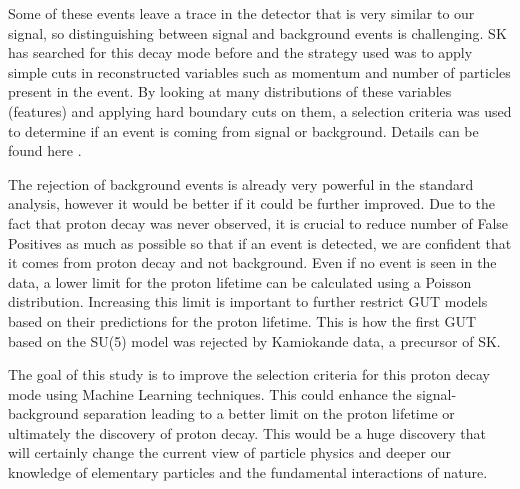 Some of these events leave a trace in the detector that is very similar to our signal, so distinguishing between signal and background events is challenging. SK has searched for this decay mode before and the strategy used was to apply simple cuts in reconstructed variables such as momentum and number of particles present in the event. By looking at many distributions of these variables (features) and applying hard boundary cuts on them, a selection criteria was used to determine if an event is coming from signal or background. Details can be found here \cite{Miura}.

The rejection of background events is already very powerful in the standard analysis, however it would be better if it could be further improved. Due to the fact that proton decay was never observed, it is crucial to reduce number of False Positives as much as possible so that if an event is detected, we are confident that it comes from proton decay and not background. Even if no event is seen in the data, a lower limit for the proton lifetime can be calculated using a Poisson distribution. Increasing this limit is important to further restrict GUT models based on their predictions for the proton lifetime. This is how the first GUT based on the SU(5) model was rejected by Kamiokande data, a precursor of SK.

The goal of this study is to improve the selection criteria for this proton decay mode using Machine Learning techniques. This could enhance the signal-background separation leading to a better limit on the proton lifetime or ultimately the discovery of proton decay. This would be a huge discovery that will certainly change the current view of particle physics and deeper our knowledge of elementary particles and the fundamental interactions of nature. 

